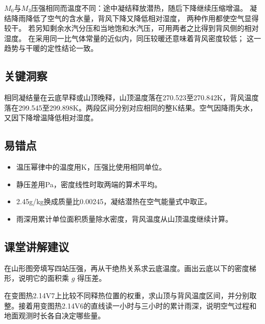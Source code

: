 \documentclass[UTF8,fontset=fandol,a4paper,11pt]{ctexart}
\begin{document}
$M_0$与$M_3$压强相同而温度不同：途中凝结释放潜热，随后下降继续压缩增温。
凝结降雨降低了空气的含水量，背风下降又降低相对湿度，
两种作用都使空气显得较干。
若另知剩余水汽分压和当地饱和水汽压，可用两者之比得到背风侧的相对湿度。
在采用同一比气体常量的近似内，同压较暖还意味着背风密度较低；
这一趋势与干暖的定性结论一致。




\subsection*{关键洞察}

相同凝结量在云底早释或山顶晚释，山顶温度落在270.523至270.842K，背风温度落在299.545至299.898K。两段区间分别对应相同的整K结果。空气因降雨失水，又因下降增温降低相对湿度。



\subsection*{易错点}

\begin{itemize}
\item 温压幂律中的温度用K，压强比使用相同单位。
\item 静压差用Pa，密度线性时取两端的算术平均。
\item 2.45g/kg换成质量比0.00245，凝结潜热在空气能量式中取正。
\item 雨深用累计单位面积质量除水密度，背风温度从山顶温度继续计算。
\end{itemize}



\subsection*{课堂讲解建议}

在山形图旁填写四站压强，再从干绝热关系求云底温度。画出云底以下的密度梯形，说明它的面积乘 $g$ 得压差。

在变图热2.14V7上比较不同释热位置的权重，求山顶与背风温度区间，并分别取整。接着用变图热2.14V6的直线读一小时与三小时的累计雨深，说明空气过程和地面观测时长各自决定哪些量。

\end{document}
